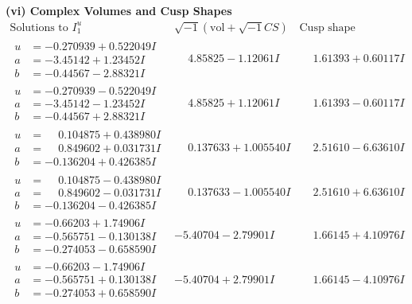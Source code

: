\documentclass[1p]{elsarticle_modified}
\theoremstyle{definition}
\newcommand{\I}{\sqrt{-1}}
\begin{document}
\newpage\flushleft \textbf{(vi) Complex Volumes and Cusp Shapes}
$$\begin{array}{c|c|c}  
\text{Solutions to }I^u_{1}& \I (\text{vol} + \sqrt{-1}CS) & \text{Cusp shape}\\
 \hline 
\begin{aligned}
u &= -0.270939 + 0.522049 I \\
a &= -3.45142 + 1.23452 I \\
b &= -0.44567 - 2.88321 I\end{aligned}
 & \phantom{-}4.85825 - 1.12061 I & \phantom{-}1.61393 + 0.60117 I \\ \hline\begin{aligned}
u &= -0.270939 - 0.522049 I \\
a &= -3.45142 - 1.23452 I \\
b &= -0.44567 + 2.88321 I\end{aligned}
 & \phantom{-}4.85825 + 1.12061 I & \phantom{-}1.61393 - 0.60117 I \\ \hline\begin{aligned}
u &= \phantom{-}0.104875 + 0.438980 I \\
a &= \phantom{-}0.849602 + 0.031731 I \\
b &= -0.136204 + 0.426385 I\end{aligned}
 & \phantom{-}0.137633 + 1.005540 I & \phantom{-}2.51610 - 6.63610 I \\ \hline\begin{aligned}
u &= \phantom{-}0.104875 - 0.438980 I \\
a &= \phantom{-}0.849602 - 0.031731 I \\
b &= -0.136204 - 0.426385 I\end{aligned}
 & \phantom{-}0.137633 - 1.005540 I & \phantom{-}2.51610 + 6.63610 I \\ \hline\begin{aligned}
u &= -0.66203 + 1.74906 I \\
a &= -0.565751 - 0.130138 I \\
b &= -0.274053 - 0.658590 I\end{aligned}
 & -5.40704 - 2.79901 I & \phantom{-}1.66145 + 4.10976 I \\ \hline\begin{aligned}
u &= -0.66203 - 1.74906 I \\
a &= -0.565751 + 0.130138 I \\
b &= -0.274053 + 0.658590 I\end{aligned}
 & -5.40704 + 2.79901 I & \phantom{-}1.66145 - 4.10976 I \\ \hline\begin{aligned}

\end{aligned}
\end{array}$$
\end{document}
